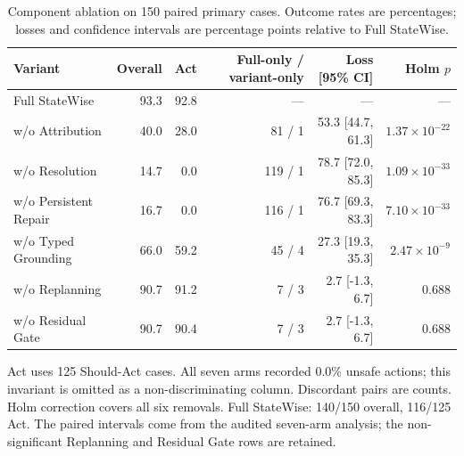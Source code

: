 \begin{table}[tbp]
\caption{Component ablation on 150 paired primary cases. Outcome rates are percentages; losses and confidence intervals are percentage points relative to Full StateWise.}
\label{tab:rq4-main}
\centering\small
\setlength{\tabcolsep}{3pt}
\renewcommand{\arraystretch}{1.12}
\begin{tabular*}{\textwidth}{@{\extracolsep{\fill}}lrrrrr@{}}
\toprule
Variant & Overall & Act & Full-only / variant-only & Loss [95\% CI] & Holm $p$ \\
\midrule
Full StateWise & 93.3 & 92.8 & --- & --- & --- \\
w/o Attribution & 40.0 & 28.0 & 81 / 1 & 53.3 [44.7, 61.3] & $1.37\!\times\!10^{-22}$ \\
w/o Resolution & 14.7 & 0.0 & 119 / 1 & 78.7 [72.0, 85.3] & $1.09\!\times\!10^{-33}$ \\
w/o Persistent Repair & 16.7 & 0.0 & 116 / 1 & 76.7 [69.3, 83.3] & $7.10\!\times\!10^{-33}$ \\
w/o Typed Grounding & 66.0 & 59.2 & 45 / 4 & 27.3 [19.3, 35.3] & $2.47\!\times\!10^{-9}$ \\
w/o Replanning & 90.7 & 91.2 & 7 / 3 & 2.7 [-1.3, 6.7] & 0.688 \\
w/o Residual Gate & 90.7 & 90.4 & 7 / 3 & 2.7 [-1.3, 6.7] & 0.688 \\
\bottomrule
\end{tabular*}
\par\smallskip
\begin{minipage}{\textwidth}\footnotesize Act uses 125 Should-Act cases. All seven arms recorded 0.0\% unsafe actions; this invariant is omitted as a non-discriminating column. Discordant pairs are counts. Holm correction covers all six removals. Full StateWise: 140/150 overall, 116/125 Act. The paired intervals come from the audited seven-arm analysis; the non-significant Replanning and Residual Gate rows are retained.\end{minipage}
\end{table}
